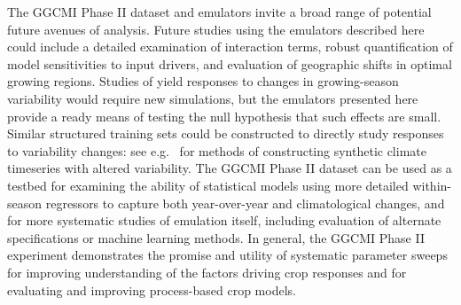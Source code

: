 \documentclass[gmd, manuscript]{copernicus} %
\begin{document}
The GGCMI Phase II dataset and emulators invite a broad range of potential future avenues of analysis.
Future studies using the emulators described here could include a detailed examination of interaction terms, robust quantification of model sensitivities to input drivers, and evaluation of geographic shifts in optimal growing regions. Studies of yield responses to changes in growing-season variability would require new simulations, but the emulators presented here provide a ready means of testing the null hypothesis that such effects are small.  Similar structured training sets could be constructed to directly study responses to variability changes: see e.g.\ \citet{poppick2016, Haugen2018} for methods of constructing synthetic climate timeseries with altered variability. 
 The GGCMI Phase II dataset can be used as a testbed for examining the ability of statistical models using more detailed within-season regressors to capture both year-over-year and climatological changes, and for more systematic 
studies of emulation itself, including evaluation of alternate specifications or machine learning methods. %
In general, the GGCMI Phase II experiment demonstrates the promise and utility of systematic parameter sweeps for improving understanding of the factors driving crop responses and for evaluating and improving process-based crop models.
\end{document}
